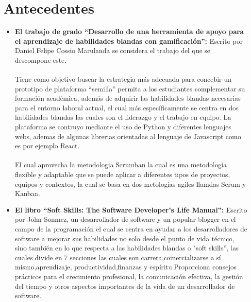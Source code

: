 \section{Antecedentes}
\begin{itemize}
    \item \textbf{El trabajo de grado “Desarrollo de una herramienta de apoyo para el aprendizaje de habilidades blandas con gamificación”:} Escrito por Daniel Felipe Cossio Marulanda se considera el trabajo del que se descompone este.
    \\ \\
Tiene como objetivo buscar la estrategia más adecuada para concebir un prototipo de plataforma “semilla” permita a los estudiantes complementar su formación académica, además de adquirir las habilidades blandas necesarias para el entorno laboral actual, el cual más específicamente se centra en dos habilidades blandas las cuales son el liderazgo y el trabajo en equipo. La plataforma se contruyo mediante el uso de Python y diferentes lenguajes webs, ademas de algunas librerias orientadas al lenguaje de Javascript como es por ejemplo  React.
 \\ \\
El cual aprovecha la metodologia Scrumban la cual es una metodología flexible y adaptable que se puede aplicar a diferentes tipos de proyectos, equipos y contextos, la cual se basa en dos metologias agiles llamdas Scrum y Kanban.

    \item \textbf{El libro “Soft Skills: The Software Developer's Life Manual”:} Escrito por John Sonmez, un desarrollador de software y un popular blogger en el campo de la programación el cual se centra en ayudar a los desarrolladores de software a mejorar sus habilidades no solo desde el punto de vida técnico, sino también en lo que respecta a las habilidades blandas o "soft skills”, las cuales divide en 7 secciones las cuales son carrera,comercializarse a sí mismo,aprendizaje, productividad,finanzas y espíritu.Proporciona consejos prácticos para el crecimiento profesional, la comunicación efectiva, la gestión del tiempo y otros aspectos importantes de la vida de un desarrollador de software.\cite{c}
    

\end{itemize}
